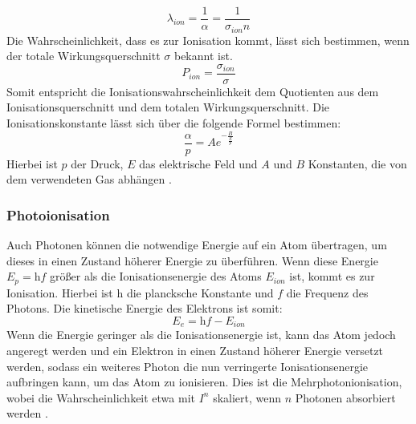 \begin{equation}
    \lambda_{ion} = \frac{1}{\alpha} = \frac{1}{\sigma_{ion} n}
    \label{eq:middelwaylen}
\end{equation}
Die Wahrscheinlichkeit, dass es zur Ionisation kommt, lässt sich bestimmen, wenn der totale Wirkungsquerschnitt \(\sigma\) bekannt ist.
\begin{equation}
    P_{ion} = \frac{\sigma_{ion}}{\sigma}
    \label{eq:ionizationprop}
\end{equation}
Somit entspricht die Ionisationswahrscheinlichkeit dem Quotienten aus dem Ionisationsquerschnitt und dem totalen Wirkungsquerschnitt. Die Ionisationskonstante lässt sich über die folgende Formel bestimmen:
\begin{equation}
    \frac{\alpha}{p} = A e^{-\frac{B}{\frac{E}{p}}}
    \label{eq:ionconst}
\end{equation}
Hierbei ist \(p\) der Druck, \(E\) das elektrische Feld und \(A\) und \(B\) Konstanten, die von dem verwendeten Gas abhängen \cite{cooray2014}.

\subsubsection{Photoionisation}
Auch Photonen können die notwendige Energie auf ein Atom übertragen, um dieses in einen Zustand höherer Energie zu überführen. Wenn diese Energie \(E_{p} = \mathrm{h}f\) größer als die Ionisationsenergie des Atoms \(E_{ion}\) ist, kommt es zur Ionisation. Hierbei ist \(\mathrm{h}\) die plancksche Konstante und \(f\) die Frequenz des Photons. Die kinetische Energie des Elektrons ist somit:
\begin{equation}
    E_{e} = \mathrm{h}f - E_{ion}
    \label{eq:photoenergyion}
\end{equation}
Wenn die Energie geringer als die Ionisationsenergie ist, kann das Atom jedoch angeregt werden und ein Elektron in einen Zustand höherer Energie versetzt werden, sodass ein weiteres Photon die nun verringerte Ionisationsenergie aufbringen kann, um das Atom zu ionisieren. Dies ist die Mehrphotonionisation, wobei die Wahrscheinlichkeit etwa mit \(I^n\) skaliert, wenn \(n\) Photonen absorbiert werden \cite{kuffel2000}.

